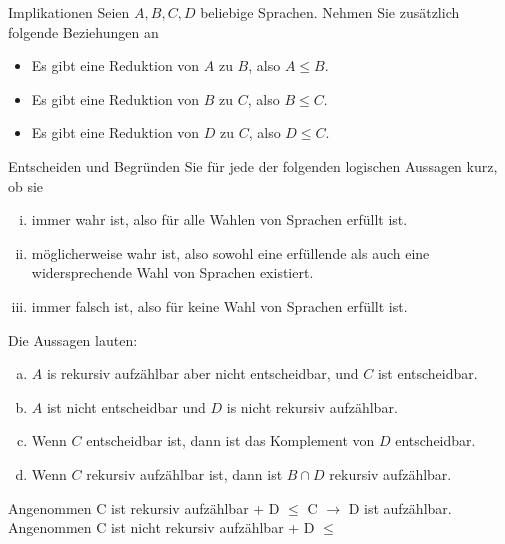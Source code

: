 \documentclass[answers]{submit}
\begin{document}
\begin{exercise}[6]{Implikationen}
  Seien $A,B,C,D$ beliebige Sprachen.
  Nehmen Sie zusätzlich folgende Beziehungen an
  \begin{itemize}
    \item Es gibt eine Reduktion von $A$ zu $B$, also $A \le B$.
    \item Es gibt eine Reduktion von $B$ zu $C$, also $B \le C$.
    \item Es gibt eine Reduktion von $D$ zu $C$, also $D \le C$.
  \end{itemize}

  Entscheiden und Begründen Sie für jede der folgenden logischen Aussagen kurz, ob sie
  \begin{enumerate}[(i)]
    \item immer wahr ist, also für alle Wahlen von Sprachen erfüllt ist.
    \item möglicherweise wahr ist, also sowohl eine erfüllende als auch eine widersprechende Wahl von Sprachen existiert.
    \item immer falsch ist, also für keine Wahl von Sprachen erfüllt ist.
  \end{enumerate}

  Die Aussagen lauten:
  \begin{enumerate}[a)]
    \item $A$ is rekursiv aufzählbar aber nicht entscheidbar, und $C$ ist entscheidbar.
    \item $A$ ist nicht entscheidbar und $D$ is nicht rekursiv aufzählbar.
    \item Wenn $C$ entscheidbar ist, dann ist das Komplement von $D$ entscheidbar.
    \item Wenn $C$ rekursiv aufzählbar ist, dann ist $B\cap D$ rekursiv aufzählbar.
  \end{enumerate}

\end{exercise}
Angenommen C ist rekursiv aufzählbar + D $\leq$ C $\xrightarrow{}$ D ist aufzählbar.
Angenommen C ist nicht rekursiv aufzählbar + D $\leq$
\end{document}
